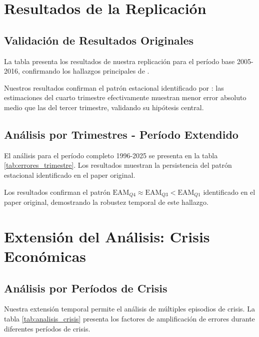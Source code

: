 \documentclass{article}
\begin{document}
\section{Resultados de la Replicación}

\subsection{Validación de Resultados Originales}

La tabla presenta los resultados de nuestra replicación para el período base 2005-2016, confirmando los hallazgos principales de \citet{pavia2017}.



Nuestros resultados confirman el patrón estacional identificado por \citet{pavia2017}: las estimaciones del cuarto trimestre efectivamente muestran menor error absoluto medio que las del tercer trimestre, validando su hipótesis central.

\subsection{Análisis por Trimestres - Período Extendido}

El análisis para el período completo 1996-2025 se presenta en la tabla \ref{tab:errores_trimestre}. Los resultados muestran la persistencia del patrón estacional identificado en el paper original.



Los resultados confirman el patrón $\text{EAM}_{Q4} \approx \text{EAM}_{Q3} < \text{EAM}_{Q1}$ identificado en el paper original, demostrando la robustez temporal de este hallazgo.

\section{Extensión del Análisis: Crisis Económicas}

\subsection{Análisis por Períodos de Crisis}

Nuestra extensión temporal permite el análisis de múltiples episodios de crisis. La tabla \ref{tab:analisis_crisis} presenta los factores de amplificación de errores durante diferentes períodos de crisis.


\end{document}
